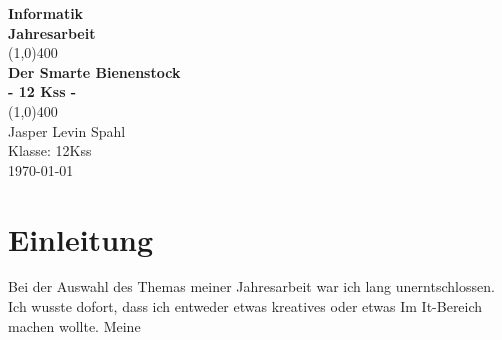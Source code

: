 \documentclass[12pt]{scrartcl}
\author{Jasper Levin Spahl}
\begin{document}
\begin{titlepage}
\begin{center}
\vspace*{1cm}

\Large{\textbf{Informatik}}\\
\Large{\textbf{Jahresarbeit}}\\
\vfill
\line(1,0){400}\\[1mm]
\huge{\textbf{Der Smarte Bienenstock}}\\[3mm]
\Large{\textbf{- 12 Kss -}}\\
\line(1,0){400}\\
\vfill
Jasper Levin Spahl\\
Klasse: 12Kss\\
\today\\
\end{center}
\end{titlepage}

\tableofcontents
\thispagestyle{empty}
\clearpage
\setcounter{page}{1}
\section{Einleitung}

Bei der Auswahl des Themas meiner Jahresarbeit war ich lang unerntschlossen.
Ich wusste dofort, dass ich entweder etwas kreatives oder etwas Im It-Bereich machen wollte.
Meine
\end{document}
